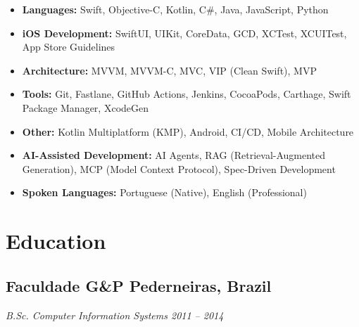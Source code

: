 \documentclass[a4paper,10pt]{article}
\begin{document}
\begin{itemize}

\item \textbf{Languages:} Swift, Objective-C, Kotlin, C\#, Java, JavaScript, Python

\item \textbf{iOS Development:} SwiftUI, UIKit, CoreData, GCD, XCTest, XCUITest, App Store Guidelines

\item \textbf{Architecture:} MVVM, MVVM-C, MVC, VIP (Clean Swift), MVP

\item \textbf{Tools:} Git, Fastlane, GitHub Actions, Jenkins, CocoaPods, Carthage, Swift Package Manager, XcodeGen

\item \textbf{Other:} Kotlin Multiplatform (KMP), Android, CI/CD, Mobile Architecture

\item \textbf{AI-Assisted Development:} AI Agents, RAG (Retrieval-Augmented Generation), MCP (Model Context Protocol), Spec-Driven Development

\item \textbf{Spoken Languages:} Portuguese (Native), English (Professional)

\end{itemize}


\section{Education}

\subsection*{\textbf{Faculdade G\&P} \hfill Pederneiras, Brazil}
\textit{B.Sc. Computer Information Systems \hfill 2011 – 2014}
\end{document}
